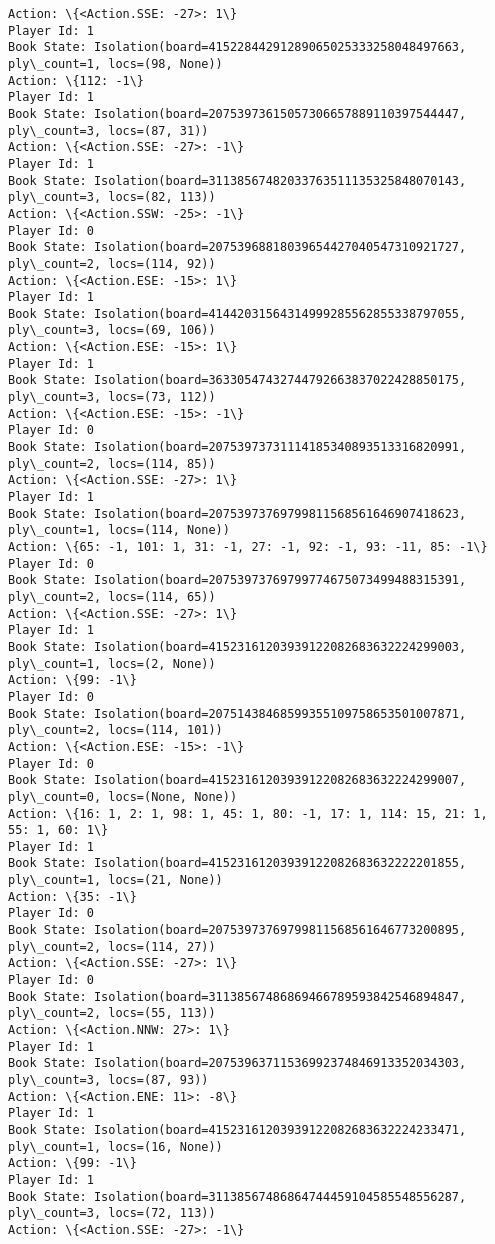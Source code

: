 \documentclass[11pt]{article}
\begin{document}
\begin{Verbatim}[commandchars=\\\{\}]
Action: \{<Action.SSE: -27>: 1\}
Player Id: 1
Book State: Isolation(board=41522844291289065025333258048497663, ply\_count=1, locs=(98, None))
Action: \{112: -1\}
Player Id: 1
Book State: Isolation(board=20753973615057306657889110397544447, ply\_count=3, locs=(87, 31))
Action: \{<Action.SSE: -27>: -1\}
Player Id: 1
Book State: Isolation(board=31138567482033763511135325848070143, ply\_count=3, locs=(82, 113))
Action: \{<Action.SSW: -25>: -1\}
Player Id: 0
Book State: Isolation(board=20753968818039654427040547310921727, ply\_count=2, locs=(114, 92))
Action: \{<Action.ESE: -15>: 1\}
Player Id: 1
Book State: Isolation(board=41442031564314999285562855338797055, ply\_count=3, locs=(69, 106))
Action: \{<Action.ESE: -15>: 1\}
Player Id: 1
Book State: Isolation(board=36330547432744792663837022428850175, ply\_count=3, locs=(73, 112))
Action: \{<Action.ESE: -15>: -1\}
Player Id: 0
Book State: Isolation(board=20753973731114185340893513316820991, ply\_count=2, locs=(114, 85))
Action: \{<Action.SSE: -27>: 1\}
Player Id: 1
Book State: Isolation(board=20753973769799811568561646907418623, ply\_count=1, locs=(114, None))
Action: \{65: -1, 101: 1, 31: -1, 27: -1, 92: -1, 93: -11, 85: -1\}
Player Id: 0
Book State: Isolation(board=20753973769799774675073499488315391, ply\_count=2, locs=(114, 65))
Action: \{<Action.SSE: -27>: 1\}
Player Id: 1
Book State: Isolation(board=41523161203939122082683632224299003, ply\_count=1, locs=(2, None))
Action: \{99: -1\}
Player Id: 0
Book State: Isolation(board=20751438468599355109758653501007871, ply\_count=2, locs=(114, 101))
Action: \{<Action.ESE: -15>: -1\}
Player Id: 0
Book State: Isolation(board=41523161203939122082683632224299007, ply\_count=0, locs=(None, None))
Action: \{16: 1, 2: 1, 98: 1, 45: 1, 80: -1, 17: 1, 114: 15, 21: 1, 55: 1, 60: 1\}
Player Id: 1
Book State: Isolation(board=41523161203939122082683632222201855, ply\_count=1, locs=(21, None))
Action: \{35: -1\}
Player Id: 0
Book State: Isolation(board=20753973769799811568561646773200895, ply\_count=2, locs=(114, 27))
Action: \{<Action.SSE: -27>: 1\}
Player Id: 0
Book State: Isolation(board=31138567486869466789593842546894847, ply\_count=2, locs=(55, 113))
Action: \{<Action.NNW: 27>: 1\}
Player Id: 1
Book State: Isolation(board=20753963711536992374846913352034303, ply\_count=3, locs=(87, 93))
Action: \{<Action.ENE: 11>: -8\}
Player Id: 1
Book State: Isolation(board=41523161203939122082683632224233471, ply\_count=1, locs=(16, None))
Action: \{99: -1\}
Player Id: 1
Book State: Isolation(board=31138567486864744459104585548556287, ply\_count=3, locs=(72, 113))
Action: \{<Action.SSE: -27>: -1\}

\end{Verbatim}
\end{document}
